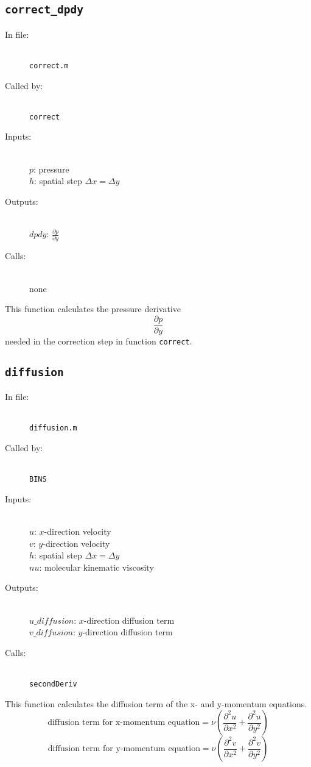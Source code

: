 \documentclass[12pt]{article}
\begin{document}
\subsection{\texttt{correct\_dpdy}}
\begin{description}
\item[In file:] \hfill \\ \texttt{correct.m}
\item[Called by:] \hfill \\ \texttt{correct}
\item[Inputs:] \hfill \\ $p$: pressure \\ $h$: spatial step $\Delta x = \Delta y$
\item[Outputs:] \hfill \\ $dpdy$: $\frac{\partial p}{\partial y}$
\item[Calls:] \hfill \\ none
\end{description}
This function calculates the pressure derivative
\[ \frac{\partial p}{\partial y}\]
needed in the correction step in function \texttt{correct}.

\subsection{\texttt{diffusion}}
\begin{description}
\item[In file:] \hfill \\ \texttt{diffusion.m}
\item[Called by:] \hfill \\ \texttt{BINS}
\item[Inputs:] \hfill \\ $u$: $x$-direction velocity \\ $v$: $y$-direction velocity \\ $h$: spatial step $\Delta x = \Delta y$ \\ $nu$: molecular kinematic viscosity
\item[Outputs:] \hfill \\ $u\_diffusion$: $x$-direction diffusion term \\ $v\_diffusion$: $y$-direction diffusion term 
\item[Calls:] \hfill \\ \texttt{secondDeriv}
\end{description}
This function calculates the diffusion term of the x- and y-momentum equations.
\[ \text{diffusion term for x-momentum equation} = \nu \left(\frac{\partial^2 u}{\partial x^2} + \frac{\partial^2 u}{\partial y^2}\right) \]
\[ \text{diffusion term for y-momentum equation} = \nu \left(\frac{\partial^2 v}{\partial x^2} + \frac{\partial^2 v}{\partial y^2}\right) \]
\end{document}
